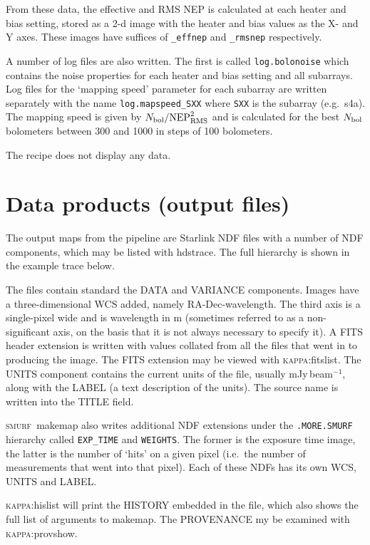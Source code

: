 \documentclass[twoside,11pt]{article}
\newcommand{\xlabel}[1]{}
\renewcommand{\_}{\texttt{\symbol{95}}}
\newcommand{\KAPPA}{\textsc{kappa}}
\newcommand{\SMURF}{\textsc{smurf}}
\newcommand{\task}[1]{\textsf{#1}}
\begin{document}
From these data, the effective and RMS NEP is calculated at each
heater and bias setting, stored as a 2-d image with the heater and
bias values as the X- and Y axes. These images have suffices of
\verb+_effnep+ and \verb+_rmsnep+ respectively.

A number of log files are also written. The first is called
\verb+log.bolonoise+ which contains the noise properties for each
heater and bias setting and all subarrays. Log files for the `mapping
speed' parameter for each subarray are written separately with the
name \verb+log.mapspeed_SXX+ where \verb+SXX+ is the subarray
(e.g.\ s4a). The mapping speed is given by $N_{\rm bol} / {\rm
  NEP}_{\rm RMS}^2$ and is calculated for the best $N_{\rm bol}$
bolometers between 300 and 1000 in steps of 100 bolometers.

The recipe does not display any data.

\section{\xlabel{dataproducts}Data products (output files)\label{se:dataprod}}

The output maps from the pipeline are Starlink NDF files with a number
of NDF components, which may be listed with \task{hdstrace}. The
full hierarchy is shown in the example trace below.

The files contain standard the DATA and VARIANCE components. Images
have a three-dimensional WCS added, namely RA-Dec-wavelength. The
third axis is a single-pixel wide and is wavelength in m (sometimes
referred to as a non-significant axis, on the basis that it is not
always necessary to specify it). A FITS header extension is written
with values collated from all the files that went in to producing the
image. The FITS extension may be viewed with
\KAPPA:\task{fitslist}. The UNITS component contains the current units
of the file, usually mJy\,beam$^{-1}$, along with the LABEL (a text
description of the units). The source name is written into the TITLE
field.

\SMURF\ \task{makemap} also writes additional NDF extensions under the
\verb+.MORE.SMURF+ hierarchy called \verb+EXP_TIME+ and
\verb+WEIGHTS+. The former is the exposure time image, the latter is
the number of `hits' on a given pixel (i.e.\ the number of
measurements that went into that pixel). Each of these NDFs has its
own WCS, UNITS and LABEL.

\KAPPA:\task{hislist} will print the HISTORY embedded in the file,
which also shows the full list of arguments to \task{makemap}. The
PROVENANCE my be examined with \KAPPA:\task{provshow}.
\end{document}
